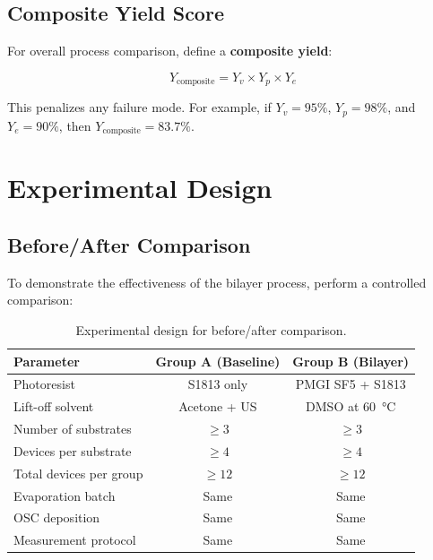 \documentclass[11pt,a4paper]{article}
\begin{document}
\subsection{Composite Yield Score}

For overall process comparison, define a \textbf{composite yield}:

\begin{equation}
    Y_{\text{composite}} = Y_v \times Y_p \times Y_e
\end{equation}

This penalizes any failure mode. For example, if $Y_v = 95\%$,
$Y_p = 98\%$, and $Y_e = 90\%$, then $Y_{\text{composite}} = 83.7\%$.

\section{Experimental Design}

\subsection{Before/After Comparison}

To demonstrate the effectiveness of the bilayer process, perform a
controlled comparison:

\begin{table}[H]
\centering
\caption{Experimental design for before/after comparison.}
\begin{tabular}{@{}lcc@{}}
\toprule
\textbf{Parameter} & \textbf{Group A (Baseline)} & \textbf{Group B (Bilayer)} \\
\midrule
Photoresist & S1813 only & PMGI SF5 + S1813 \\
Lift-off solvent & Acetone + US & DMSO at \SI{60}{\celsius} \\
Number of substrates & $\geq 3$ & $\geq 3$ \\
Devices per substrate & $\geq 4$ & $\geq 4$ \\
Total devices per group & $\geq 12$ & $\geq 12$ \\
Evaporation batch & Same & Same \\
OSC deposition & Same & Same \\
Measurement protocol & Same & Same \\
\bottomrule
\end{tabular}
\end{table}
\end{document}
